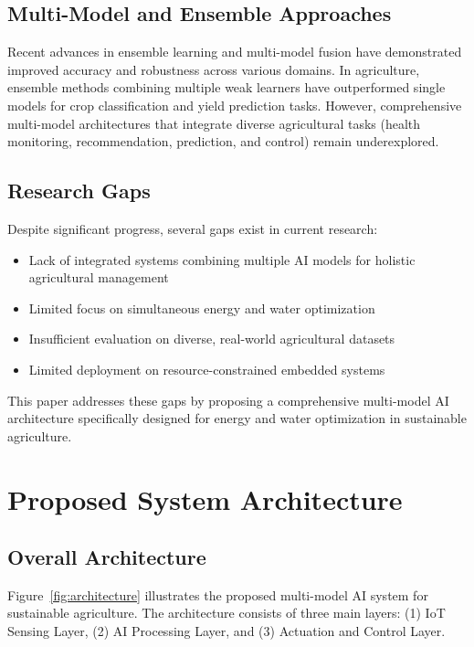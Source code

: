 \documentclass[conference]{IEEEtran}
\begin{document}
\subsection{Multi-Model and Ensemble Approaches}

Recent advances in ensemble learning and multi-model fusion have demonstrated improved accuracy and robustness across various domains. In agriculture, ensemble methods combining multiple weak learners have outperformed single models for crop classification and yield prediction tasks. However, comprehensive multi-model architectures that integrate diverse agricultural tasks (health monitoring, recommendation, prediction, and control) remain underexplored.

\subsection{Research Gaps}

Despite significant progress, several gaps exist in current research:
\begin{itemize}
\item Lack of integrated systems combining multiple AI models for holistic agricultural management
\item Limited focus on simultaneous energy and water optimization
\item Insufficient evaluation on diverse, real-world agricultural datasets
\item Limited deployment on resource-constrained embedded systems
\end{itemize}

This paper addresses these gaps by proposing a comprehensive multi-model AI architecture specifically designed for energy and water optimization in sustainable agriculture.

\section{Proposed System Architecture}

\subsection{Overall Architecture}

Figure~\ref{fig:architecture} illustrates the proposed multi-model AI system for sustainable agriculture. The architecture consists of three main layers: (1) IoT Sensing Layer, (2) AI Processing Layer, and (3) Actuation and Control Layer.
\end{document}
